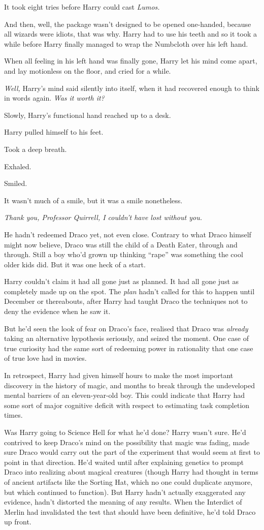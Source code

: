 It took eight tries before Harry could cast \emph{Lumos.}

And then, well, the package wasn't designed to be opened one-handed,
because all wizards were idiots, that was why. Harry had to use his
teeth and so it took a while before Harry finally managed to wrap the
Numbcloth over his left hand.

When all feeling in his left hand was finally gone, Harry let his mind
come apart, and lay motionless on the floor, and cried for a while.

\emph{Well,} Harry's mind said silently into itself, when it had
recovered enough to think in words again. \emph{Was it worth it?}

Slowly, Harry's functional hand reached up to a desk.

Harry pulled himself to his feet.

Took a deep breath.

Exhaled.

Smiled.

It wasn't much of a smile, but it was a smile nonetheless.

\emph{Thank you, Professor Quirrell, I couldn't have lost without you.}

He hadn't redeemed Draco yet, not even close. Contrary to what Draco
himself might now believe, Draco was still the child of a Death Eater,
through and through. Still a boy who'd grown up thinking ``rape'' was
something the cool older kids did. But it was one heck of a start.

Harry couldn't claim it had all gone just as planned. It had all gone
just as completely made up on the spot. The \emph{plan} hadn't called
for this to happen until December or thereabouts, after Harry had taught
Draco the techniques not to deny the evidence when he saw it.

But he'd seen the look of fear on Draco's face, realised that Draco was
\emph{already} taking an alternative hypothesis seriously, and seized
the moment. One case of true curiosity had the same sort of redeeming
power in rationality that one case of true love had in movies.

In retrospect, Harry had given himself hours to make the most important
discovery in the history of magic, and months to break through the
undeveloped mental barriers of an eleven-year-old boy. This could
indicate that Harry had some sort of major cognitive deficit with
respect to estimating task completion times.

Was Harry going to Science Hell for what he'd done? Harry wasn't sure.
He'd contrived to keep Draco's mind on the possibility that magic was
fading, made sure Draco would carry out the part of the experiment that
would seem at first to point in that direction. He'd waited until after
explaining genetics to prompt Draco into realizing about magical
creatures (though Harry had thought in terms of ancient artifacts like
the Sorting Hat, which no one could duplicate anymore, but which
continued to function). But Harry hadn't actually exaggerated any
evidence, hadn't distorted the meaning of any results. When the
Interdict of Merlin had invalidated the test that should have been
definitive, he'd told Draco up front.

